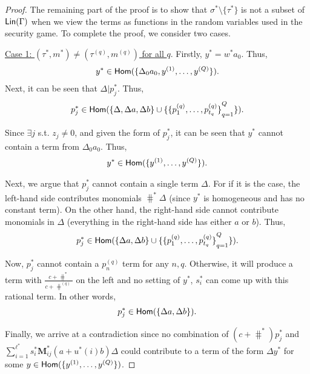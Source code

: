 \begin{proof}
The remaining part of the proof is to show that $\sigma^\ast\setminus\{\tau^\ast\}$ is not a subset of $\textsf{Lin}(\Gamma)$ when we view the terms as functions in the random variables used in the security game. To complete the proof, we consider two cases.

\noindent\underline{Case 1: $(\tau^\ast, m^\ast) \neq (\tau^{(q)}, m^{(q)})$ for all $q$}. Firstly, $y^\ast =w^\ast a_0$. Thus,
\begin{align*}
  y^\ast \in \textsf{Hom}(\{\Delta_0a_0, y^{(1)}, \dots, y^{(Q)}\}).
\end{align*}
Next, it can be seen that $\Delta | p_j^\ast$. Thus,
\begin{align*}
  p_j^\ast \in \textsf{Hom}( \{\Delta, \Delta a, \Delta b\} \cup \{ {\{p_1^{(q)}, \dots, p_{t_q}^{(q)}  \}}_{q=1}^Q\} ).
\end{align*}

Since $\exists j$ s.t. $z_j \neq 0$, and given the form of $p_j^\ast$, it can be seen that $y^\ast$ cannot contain a term from $\Delta_0 a_0$. Thus,
\begin{align*}
  y^\ast \in \textsf{Hom}(\{y^{(1)}, \dots, y^{(Q)}\}).
\end{align*}

Next, we argue that $p_j^\ast$ cannot contain a single term $\Delta$. For if it is the case, the left-hand side contributes monomials $\hash^\ast\Delta$ (since $y^\ast$ is homogeneous and has no constant term). On the other hand, the right-hand side cannot contribute monomials in $\Delta$ (everything in the right-hand side has either $a$ or $b$). Thus,
\begin{align*}
  p_j^\ast \in \textsf{Hom}( \{\Delta a, \Delta b\} \cup \{ {\{p_1^{(q)}, \dots, p_{t_q}^{(q)}  \}}_{q=1}^Q\} ).
\end{align*}

Now, $p_j^\ast$ cannot contain a $p_n^{(q)}$ term for any $n, q$. Otherwise, it will produce a term with $\frac{c+\hash^\ast}{c+\hash^{(q)}}$ on the left and no setting of $y^\ast$, $s_i^\ast$ can come up with this rational term. In other words,
\begin{align*}
  p_j^\ast \in \textsf{Hom}( \{\Delta a, \Delta b\}).
\end{align*}

Finally, we arrive at a contradiction since no combination of $(c+\hash^\ast)p_j^\ast$ and $\sum_{i=1}^{\ell^\ast} s^\ast_i \mathbf{M}^\ast_{ij}(a+u^\ast(i)b)\Delta$ could contribute to a term of the form $\Delta y^\ast$ for some $y\in \textsf{Hom}(\{y^{(1)}, \dots, y^{(Q)}\})$.


\end{proof}

